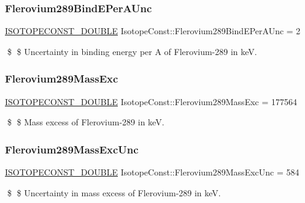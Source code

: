 \subsubsection{\texorpdfstring{Flerovium289\+Bind\+E\+Per\+A\+Unc}{Flerovium289BindEPerAUnc}}
{\footnotesize\ttfamily \mbox{\hyperlink{group___isotope_const-_macros_ga8f45a7272ce02c0b4c65c44636ed719a}{I\+S\+O\+T\+O\+P\+E\+C\+O\+N\+S\+T\+\_\+\+D\+O\+U\+B\+LE}} Isotope\+Const\+::\+Flerovium289\+Bind\+E\+Per\+A\+Unc = 2}

\$ \$ Uncertainty in binding energy per A of Flerovium-\/289 in keV. \mbox{\label{group___isotope_const-_flerovium-_fl289_ga0a4e698113eea71ad4cc7ccf0b118abf}} 
\subsubsection{\texorpdfstring{Flerovium289\+Mass\+Exc}{Flerovium289MassExc}}
{\footnotesize\ttfamily \mbox{\hyperlink{group___isotope_const-_macros_ga8f45a7272ce02c0b4c65c44636ed719a}{I\+S\+O\+T\+O\+P\+E\+C\+O\+N\+S\+T\+\_\+\+D\+O\+U\+B\+LE}} Isotope\+Const\+::\+Flerovium289\+Mass\+Exc = 177564}

\$ \$ Mass excess of Flerovium-\/289 in keV. \mbox{\label{group___isotope_const-_flerovium-_fl289_gaf37a21449f784e448c0c4496f6ab4fea}} 
\subsubsection{\texorpdfstring{Flerovium289\+Mass\+Exc\+Unc}{Flerovium289MassExcUnc}}
{\footnotesize\ttfamily \mbox{\hyperlink{group___isotope_const-_macros_ga8f45a7272ce02c0b4c65c44636ed719a}{I\+S\+O\+T\+O\+P\+E\+C\+O\+N\+S\+T\+\_\+\+D\+O\+U\+B\+LE}} Isotope\+Const\+::\+Flerovium289\+Mass\+Exc\+Unc = 584}

\$ \$ Uncertainty in mass excess of Flerovium-\/289 in keV. \mbox{\label{group___isotope_const-_flerovium-_fl289_ga72c7e6de646a1064b4863e103f116097}} 
